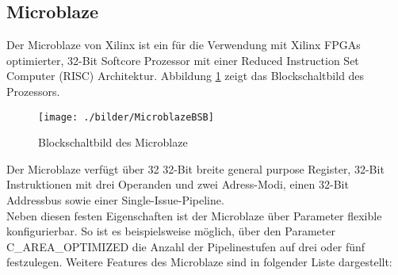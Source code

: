 \subsection{Microblaze}
Der Microblaze von Xilinx ist ein für die Verwendung mit Xilinx FPGAs optimierter, 32-Bit Softcore Prozessor mit einer Reduced Instruction Set Computer (RISC) Architektur. Abbildung \ref{fig:MicroblazeBSB} zeigt das Blockschaltbild des Prozessors.\\
\begin{figure}[h!]
\centering
\texttt{[image: ./bilder/MicroblazeBSB]}
\caption{Blockschaltbild des Microblaze \cite{MBREF}}
\label{fig:MicroblazeBSB}
\end{figure}
\noindent
Der Microblaze verfügt über 32 32-Bit breite general purpose Register, 32-Bit Instruktionen mit drei Operanden und zwei Adress-Modi, einen
32-Bit Addressbus sowie einer Single-Issue-Pipeline.\\
Neben diesen festen Eigenschaften ist der Microblaze über Parameter flexible konfigurierbar. So ist es beispielsweise möglich, über den Parameter C\_AREA\_OPTIMIZED die Anzahl der Pipelinestufen auf drei oder fünf festzulegen. Weitere Features des Microblaze sind in folgender Liste dargestellt:\\
